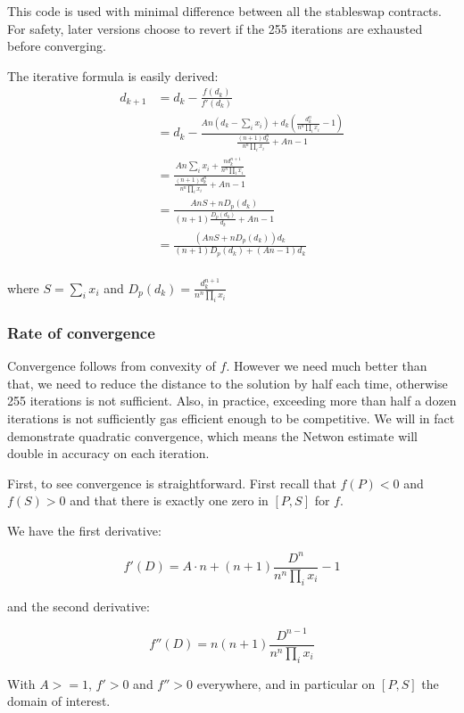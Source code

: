 \documentclass[
]{article}
\begin{document}
This code is used with minimal difference between all the stableswap
contracts. For safety, later versions choose to revert if the 255
iterations are exhausted before converging.

The iterative formula is easily derived: \[\begin{aligned}
d_{k+1} &= d_k - \frac{f(d_k)}{f'(d_k)} \\
&= d_k - \frac{A n (d_k - \sum_i x_i)  + d_k(\frac{d_k^{n}}{n^n \prod_i x_i} - 1)}{\frac{(n+1)d_k^n}{n^n \prod_i x_i} + An - 1} \\
&= \frac{An\sum_i x_i + \frac{nd_k^{n+1}}{n^n \prod_i x_i}}{\frac{(n+1)d_k^n}{n^n\prod_i x_i} + An - 1} \\
&= \frac{AnS + nD_p(d_k)}{(n+1)\frac{D_p(d_k)}{d_k} + An - 1} \\
&= \frac{(AnS + nD_p(d_k))d_k}{(n+1)D_p(d_k) + (An-1)d_k}\\
\end{aligned}\]

where \(S = \sum_i x_i\) and
\(D_p(d_k) = \frac{d_k^{n+1}}{n^n \prod_i x_i}\)

\hypertarget{rate-of-convergence}{%
\subsubsection{Rate of convergence}\label{rate-of-convergence}}

Convergence follows from convexity of \(f\). However we need much better
than that, we need to reduce the distance to the solution by half each
time, otherwise 255 iterations is not sufficient. Also, in practice,
exceeding more than half a dozen iterations is not sufficiently gas
efficient enough to be competitive. We will in fact demonstrate
quadratic convergence, which means the Netwon estimate will double in
accuracy on each iteration.

First, to see convergence is straightforward. First recall that
\(f(P) < 0\) and \(f(S) > 0\) and that there is exactly one zero in
\([P, S]\) for \(f\).

We have the first derivative:

\[ f'(D) = A\cdot n + (n+1) \frac{D^n}{n^n \prod_i x_i} - 1 \]

and the second derivative:

\[ f''(D) = n (n+1) \frac{D^{n-1}}{n^n \prod_i x_i} \]

With \(A >= 1\), \(f' > 0\) and \(f'' > 0\) everywhere, and in
particular on \([P, S]\) the domain of interest.
\end{document}
